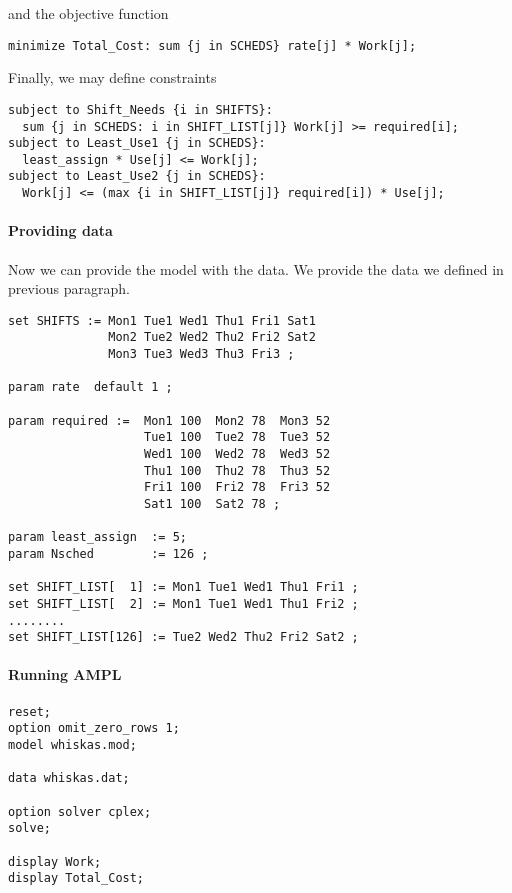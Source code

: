 and the objective function

\begin{lstlisting}
minimize Total_Cost: sum {j in SCHEDS} rate[j] * Work[j];
\end{lstlisting}

Finally, we may define constraints

\begin{lstlisting}
subject to Shift_Needs {i in SHIFTS}:
  sum {j in SCHEDS: i in SHIFT_LIST[j]} Work[j] >= required[i];
subject to Least_Use1 {j in SCHEDS}: 
  least_assign * Use[j] <= Work[j];
subject to Least_Use2 {j in SCHEDS}:
  Work[j] <= (max {i in SHIFT_LIST[j]} required[i]) * Use[j];
\end{lstlisting}

\paragraph{Providing data}

Now we can provide the model with the data. We provide the data we defined in previous paragraph.

\begin{lstlisting}
set SHIFTS := Mon1 Tue1 Wed1 Thu1 Fri1 Sat1
              Mon2 Tue2 Wed2 Thu2 Fri2 Sat2
              Mon3 Tue3 Wed3 Thu3 Fri3 ;

param rate  default 1 ;

param required :=  Mon1 100  Mon2 78  Mon3 52 
                   Tue1 100  Tue2 78  Tue3 52
                   Wed1 100  Wed2 78  Wed3 52
                   Thu1 100  Thu2 78  Thu3 52
                   Fri1 100  Fri2 78  Fri3 52
                   Sat1 100  Sat2 78 ;
                   
param least_assign  := 5;
param Nsched        := 126 ;

set SHIFT_LIST[  1] := Mon1 Tue1 Wed1 Thu1 Fri1 ;
set SHIFT_LIST[  2] := Mon1 Tue1 Wed1 Thu1 Fri2 ;
........
set SHIFT_LIST[126] := Tue2 Wed2 Thu2 Fri2 Sat2 ;
\end{lstlisting} 

\paragraph{Running AMPL}

\begin{lstlisting}
reset;
option omit_zero_rows 1;
model whiskas.mod;

data whiskas.dat;

option solver cplex;
solve;

display Work;
display Total_Cost;
\end{lstlisting}

